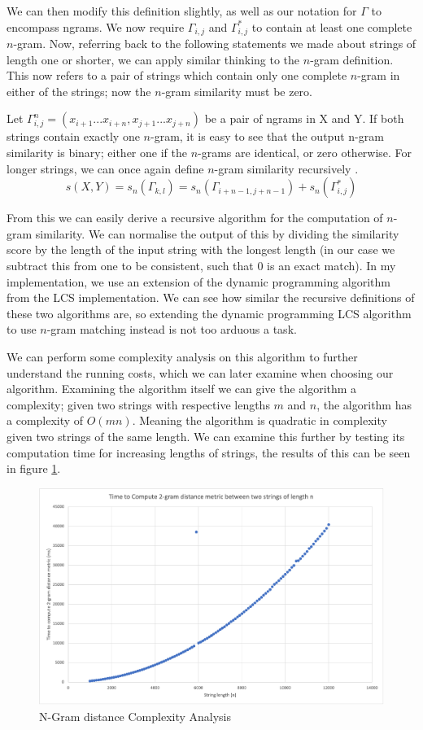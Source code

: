 \documentclass[a4paper,11pt]{article}
\begin{document}
We can then modify this definition slightly, as well as our notation for $\Gamma$ to encompass ngrams. We now require $\Gamma_{i,j}$ and $\Gamma_{i,j}^*$ to contain at least one complete $n$-gram. Now, referring back to the following statements we made about strings of length one or shorter, we can apply similar thinking to the $n$-gram definition. This now refers to a pair of strings which contain only one complete $n$-gram in either of the strings; now the $n$-gram similarity must be zero.

Let $\Gamma^n_{i,j}=(x_{i+1}...x_{i+n}, x_{j+1}...x_{j+n})$ be a pair of ngrams in X and Y. If both strings contain exactly one $n$-gram, it is easy to see that the output n-gram similarity is binary; either one if the $n$-grams are identical, or zero otherwise. For longer strings, we can once again define $n$-gram similarity recursively \citep{ngramDistanceImplementation}.
\begin{equation}
    s(X,Y)=s_n(\Gamma_{k,l})=s_n(\Gamma_{i+n-1, j+n-1}) + s_n(\Gamma^*_{i,j})
\end{equation}

From this we can easily derive a recursive algorithm for the computation of $n$-gram similarity. We can normalise the output of this by dividing the similarity score by the length of the input string with the longest length (in our case we subtract this from one to be consistent, such that 0 is an exact match). In my implementation, we use an extension of the dynamic programming algorithm from the LCS implementation. We can see how similar the recursive definitions of these two algorithms are, so extending the dynamic programming LCS algorithm to use $n$-gram matching instead is not too arduous a task.

We can perform some complexity analysis on this algorithm to further understand the running costs, which we can later examine when choosing our algorithm. Examining the algorithm itself we can give the algorithm a complexity; given two strings with respective lengths $m$ and $n$, the algorithm has a complexity of $O(mn)$. Meaning the algorithm is quadratic in complexity given two strings of the same length. We can examine this further by testing its computation time for increasing lengths of strings, the results of this can be seen in figure \ref{fig:ngramComplexityAnalysis}.

\begin{figure}
    \centering
    \includegraphics[width=0.8\linewidth]{diagrams/ngramComplexity.png}
    \caption{N-Gram distance Complexity Analysis}
    \label{fig:ngramComplexityAnalysis}
\end{figure}
\end{document}
